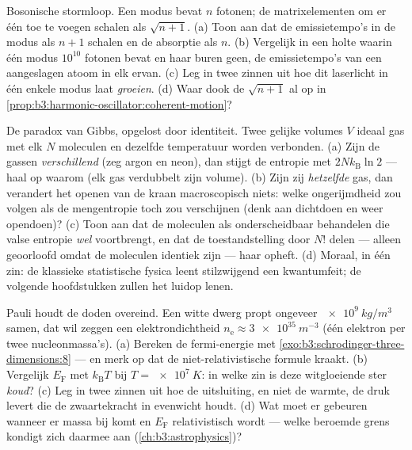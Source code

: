 \begin{exercise}[$\star\star$]\label{exo:b3:identical-particles:9}
Bosonische stormloop. Een modus bevat $n$ fotonen; de matrixelementen om
er één toe te voegen schalen als $\sqrt{n+1}$. (a) Toon aan dat de
emissietempo's in de modus als $n + 1$ schalen en de absorptie als $n$.
(b) Vergelijk in een holte waarin één modus $10^{10}$ fotonen bevat en
haar buren geen, de emissietempo's van een aangeslagen atoom in elk
ervan. (c) Leg in twee zinnen uit hoe dit laserlicht in één enkele modus
laat \emph{groeien}. (d) Waar dook de $\sqrt{n+1}$ al op in
\cref{prop:b3:harmonic-oscillator:coherent-motion}?
\end{exercise}

\begin{exercise}[$\star\star\star$]\label{exo:b3:identical-particles:10}
De paradox van Gibbs, opgelost door identiteit. Twee gelijke volumes $V$
ideaal gas met elk $N$ moleculen en dezelfde temperatuur worden verbonden.
(a) Zijn de gassen \emph{verschillend} (zeg argon en neon), dan stijgt de
entropie met $2Nk_{\text{B}}\ln2$ --- haal op waarom (elk gas verdubbelt
zijn volume). (b) Zijn zij \emph{hetzelfde} gas, dan verandert het openen
van de kraan macroscopisch niets: welke ongerijmdheid zou volgen als de
mengentropie toch zou verschijnen (denk aan dichtdoen en weer opendoen)?
(c) Toon aan dat de moleculen als onderscheidbaar behandelen die valse
entropie \emph{wel} voortbrengt, en dat de toestandstelling door $N!$
delen --- alleen geoorloofd omdat de moleculen identiek zijn --- haar
opheft. (d) Moraal, in één zin: de klassieke statistische fysica leent
stilzwijgend een kwantumfeit; de volgende hoofdstukken zullen het luidop
lenen.
\end{exercise}

\begin{exercise}[$\star\star\star$]\label{exo:b3:identical-particles:11}
Pauli houdt de doden overeind. Een witte dwerg propt ongeveer
$\qty{e9}{kg/m^3}$ samen, dat wil zeggen een elektrondichtheid
$n_{\text{e}} \approx
\qty{3e35}{m^{-3}}$ (één elektron per twee
nucleonmassa's). (a) Bereken de fermi-energie met
\cref{exo:b3:schrodinger-three-dimensions:8}
--- en merk op dat de niet-relativistische formule kraakt. (b) Vergelijk
$E_{\text{F}}$ met $k_{\text{B}}T$ bij $T = \qty{e7}{K}$: in welke zin is
deze witgloeiende ster \emph{koud}? (c) Leg in twee zinnen uit hoe de
uitsluiting, en niet de warmte, de druk levert die de zwaartekracht in
evenwicht houdt. (d) Wat moet er gebeuren wanneer er massa bij komt en
$E_{\text{F}}$ relativistisch wordt --- welke beroemde grens kondigt zich
daarmee aan (\cref{ch:b3:astrophysics})?
\end{exercise}

